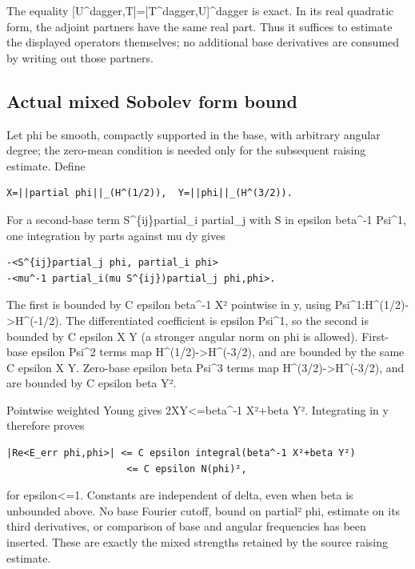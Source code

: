 \documentclass[11pt]{article}
\theoremstyle{definition}
\theoremstyle{remark}
\numberwithin{equation}{section}
\begin{document}
The equality {[}U\^{}dagger,T{]}={[}T\^{}dagger,U{]}\^{}dagger is exact.
In its real quadratic form, the adjoint partners have the same real
part. Thus it suffices to estimate the displayed operators themselves;
no additional base derivatives are consumed by writing out those
partners.

\hypertarget{source-71285ede3265-actual-mixed-sobolev-form-bound}{%
\subsection{Actual mixed Sobolev form
bound}\label{source-71285ede3265-actual-mixed-sobolev-form-bound}}

Let phi be smooth, compactly supported in the base, with arbitrary
angular degree; the zero-mean condition is needed only for the
subsequent raising estimate. Define

\begin{verbatim}
X=||partial phi||_(H^(1/2)),  Y=||phi||_(H^(3/2)).
\end{verbatim}

For a second-base term S\^{}\{ij\}partial\_i partial\_j with S in
epsilon beta\^{}-1 Psi\^{}1, one integration by parts against mu dy
gives

\begin{verbatim}
-<S^{ij}partial_j phi, partial_i phi>
-<mu^-1 partial_i(mu S^{ij})partial_j phi,phi>.
\end{verbatim}

The first is bounded by C epsilon beta\^{}-1 X² pointwise in y, using
Psi\^{}1:H\^{}(1/2)-\textgreater H\^{}(-1/2). The differentiated
coefficient is epsilon Psi\^{}1, so the second is bounded by C epsilon X
Y (a stronger angular norm on phi is allowed). First-base epsilon
Psi\^{}2 terms map H\^{}(1/2)-\textgreater H\^{}(-3/2), and are bounded
by the same C epsilon X Y. Zero-base epsilon beta Psi\^{}3 terms map
H\^{}(3/2)-\textgreater H\^{}(-3/2), and are bounded by C epsilon beta
Y².

Pointwise weighted Young gives 2XY\textless=beta\^{}-1 X²+beta Y².
Integrating in y therefore proves

\begin{verbatim}
|Re<E_err phi,phi>| <= C epsilon integral(beta^-1 X²+beta Y²)
                     <= C epsilon N(phi)²,
\end{verbatim}

for epsilon\textless=1. Constants are independent of delta, even when
beta is unbounded above. No base Fourier cutoff, bound on partial² phi,
estimate on its third derivatives, or comparison of base and angular
frequencies has been inserted. These are exactly the mixed strengths
retained by the source raising estimate.
\end{document}
